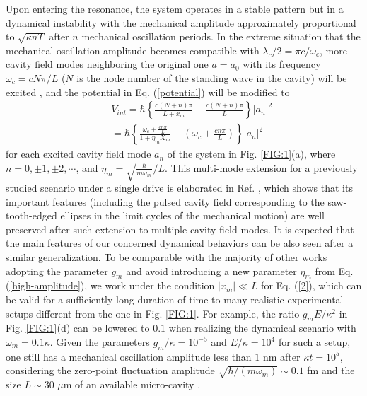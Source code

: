\documentclass[a4paper,fleqn]{cas-dc}
\begin{document}
Upon entering the resonance, the system operates in a stable pattern but in a dynamical instability with the mechanical amplitude approximately proportional to $\sqrt{\kappa nT}$ after $n$ mechanical oscillation periods. In the extreme situation that the mechanical oscillation amplitude becomes compatible with $\lambda_c/2=\pi c/\omega_c$, more cavity field modes neighboring the original one $a=a_0$ with its frequency $\omega_c=cN\pi/L$ ($N$ is the node number of the standing wave in the cavity) will be excited \cite{gao2015self}, and the potential in 
Eq. (\ref{potential}) will be modified to 
\begin{eqnarray}
&&V_{int}=\hbar\left\{\frac{c(N+n)\pi}{L+x_m}-\frac{c(N+n)\pi}{L}\right\}|a_n|^2\nonumber\\
&&=\hbar\left\{\frac{\omega_c+\frac{cn\pi}{L}}{1+\eta_mX_m}-(\omega_c+\frac{cn\pi}{L})\right\}|a_n|^2
\label{high-amplitude}
\end{eqnarray}
for each excited cavity field mode $a_n$ of the system in Fig. \ref{FIG:1}(a), where $n=0,\pm 1,\pm 2,\cdots$, and $\eta_m=\sqrt{\frac{\hbar}{m\omega_m}}/L$. This multi-mode extension for a previously studied scenario under a single drive \cite{poot2012backaction} is elaborated in Ref. \cite{gao2015self}, which shows that its important features (including the pulsed cavity field corresponding to the saw-tooth-edged ellipses in the limit cycles of the mechanical motion) are well preserved after such extension to multiple cavity field modes. It is expected that the main features of our concerned dynamical behaviors can be also seen after a similar generalization. To be comparable with the majority of other works adopting the parameter $g_m$ and avoid introducing a new parameter $\eta_m$ from Eq. (\ref{high-amplitude}), we work under the condition $|x_m|\ll L$ for Eq. (\ref{2}), which can be valid for a sufficiently long duration of time to many realistic experimental setups different from the one in Fig. \ref{FIG:1}. For example, the ratio $g_mE/\kappa^2$ in Fig. \ref{FIG:1}(d) can be lowered to $0.1$ when realizing the dynamical scenario with $\omega_m=0.1\kappa$. Given the parameters $g_m/\kappa=10^{-5}$ and $E/\kappa=10^{4}$ for such a setup, one still has a mechanical oscillation amplitude less than $1$ nm after $\kappa t=10^5$, considering the zero-point fluctuation amplitude $\sqrt{\hbar/(m\omega_m)}\sim 0.1$ fm and the size $L\sim 30$ $\mu$m of an available micro-cavity \cite{hu2021generation}.  
\end{document}
